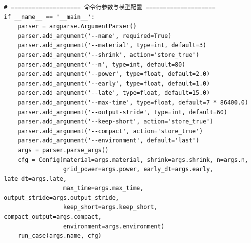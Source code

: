 \begin{Verbatim}[fontsize=\scriptsize,breaklines=true,breakanywhere=true]
# ==================== 命令行参数与模型配置 ====================
if __name__ == '__main__':
    parser = argparse.ArgumentParser()
    parser.add_argument('--name', required=True)
    parser.add_argument('--material', type=int, default=3)
    parser.add_argument('--shrink', action='store_true')
    parser.add_argument('--n', type=int, default=80)
    parser.add_argument('--power', type=float, default=2.0)
    parser.add_argument('--early', type=float, default=1.0)
    parser.add_argument('--late', type=float, default=15.0)
    parser.add_argument('--max-time', type=float, default=7 * 86400.0)
    parser.add_argument('--output-stride', type=int, default=60)
    parser.add_argument('--keep-short', action='store_true')
    parser.add_argument('--compact', action='store_true')
    parser.add_argument('--environment', default='last')
    args = parser.parse_args()
    cfg = Config(material=args.material, shrink=args.shrink, n=args.n,
                 grid_power=args.power, early_dt=args.early, late_dt=args.late,
                 max_time=args.max_time, output_stride=args.output_stride,
                 keep_short=args.keep_short, compact_output=args.compact,
                 environment=args.environment)
    run_case(args.name, cfg)
\end{Verbatim}

